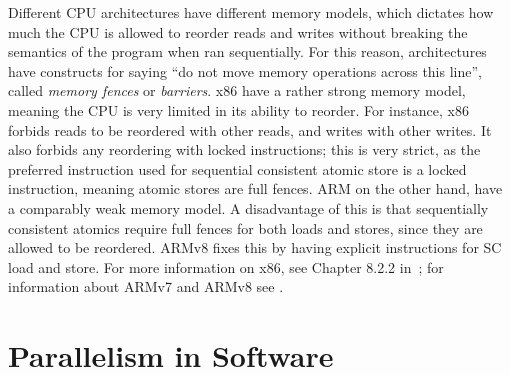 \documentclass[a4paper,twoside]{report}
\begin{document}
 Different CPU architectures have different memory models, which
dictates how much the CPU is allowed to reorder reads and writes without
breaking the semantics of the program when ran sequentially.  For this reason,
architectures have constructs for saying ``do not move memory operations across
this line'', called \emph{memory fences} or \emph{barriers}.  x86 have a rather
strong memory model, meaning the CPU is very limited in its ability to reorder.
For instance, x86 forbids reads to be reordered with other reads, and writes
with other writes. It also forbids any reordering with locked instructions;
this is very strict, as the preferred instruction used for sequential
consistent atomic store is a locked instruction, meaning atomic stores are full
fences.  ARM on the other hand, have a comparably weak memory model. A
disadvantage of this is that sequentially consistent atomics require full fences
for both loads and stores, since they are allowed to be reordered.  ARMv8 fixes
this by having explicit instructions for SC load and store.  For more
information on x86, see Chapter 8.2.2 in~\cite{intel64}; for information about
ARMv7 and ARMv8 see .





\section{Parallelism in Software}
\end{document}
